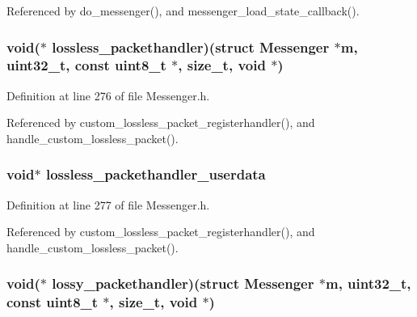 Referenced by do\+\_\+messenger(), and messenger\+\_\+load\+\_\+state\+\_\+callback().

\hypertarget{struct_messenger_ade523661676bfd811bd8676c29600900}{
\subsubsection[{lossless\+\_\+packethandler}]{\setlength{\rightskip}{0pt plus 5cm}void($\ast$ lossless\+\_\+packethandler)(struct {\bf Messenger} $\ast${\bf m}, uint32\+\_\+t, const uint8\+\_\+t $\ast$, size\+\_\+t, void $\ast$)}}\label{struct_messenger_ade523661676bfd811bd8676c29600900}


Definition at line 276 of file Messenger.\+h.



Referenced by custom\+\_\+lossless\+\_\+packet\+\_\+registerhandler(), and handle\+\_\+custom\+\_\+lossless\+\_\+packet().

\hypertarget{struct_messenger_aa46ae2a29721e8b27e0d4aac8b64b195}{
\subsubsection[{lossless\+\_\+packethandler\+\_\+userdata}]{\setlength{\rightskip}{0pt plus 5cm}void$\ast$ lossless\+\_\+packethandler\+\_\+userdata}}\label{struct_messenger_aa46ae2a29721e8b27e0d4aac8b64b195}


Definition at line 277 of file Messenger.\+h.



Referenced by custom\+\_\+lossless\+\_\+packet\+\_\+registerhandler(), and handle\+\_\+custom\+\_\+lossless\+\_\+packet().

\hypertarget{struct_messenger_afba23a025d7275ca11e8f7d56386d3d1}{
\subsubsection[{lossy\+\_\+packethandler}]{\setlength{\rightskip}{0pt plus 5cm}void($\ast$ lossy\+\_\+packethandler)(struct {\bf Messenger} $\ast${\bf m}, uint32\+\_\+t, const uint8\+\_\+t $\ast$, size\+\_\+t, void $\ast$)}}\label{struct_messenger_afba23a025d7275ca11e8f7d56386d3d1}


